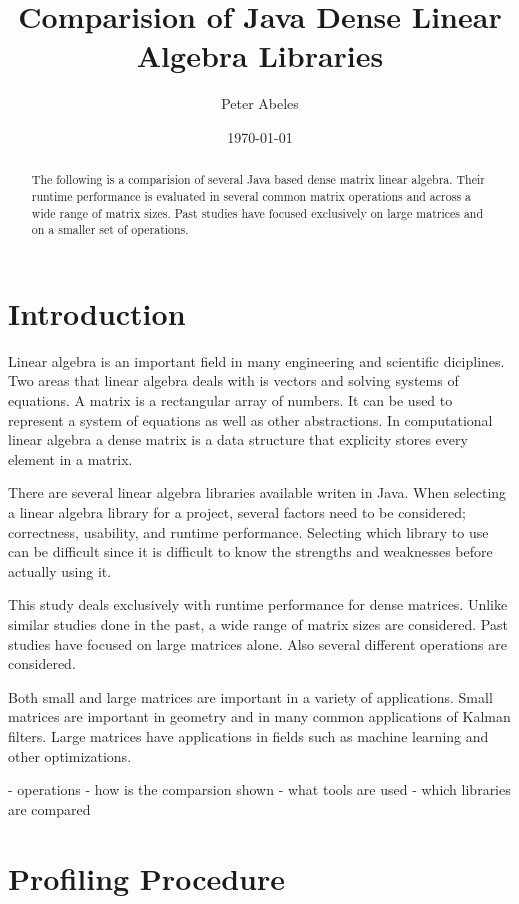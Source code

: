 \documentclass[12pt]{article}%
\title{Comparision of Java Dense Linear Algebra Libraries}
\author{Peter Abeles}
\date{\today}
\begin{document}
\maketitle

\tableofcontents

\begin{abstract}
The following is a comparision of several Java based dense matrix linear algebra.  Their runtime performance is evaluated in several common matrix operations and across a wide range of matrix sizes.  Past studies have focused exclusively on large matrices and on a smaller set of operations.
\end{abstract}


\section{Introduction}

Linear algebra is an important field in many engineering and scientific diciplines.  Two areas that linear algebra deals with is vectors and solving systems of equations.  A matrix is a rectangular array of numbers.  It can be used to represent a system of equations as well as other abstractions.  In computational linear algebra a dense matrix is a data structure that explicity stores every element in a matrix.

There are several linear algebra libraries available writen in Java.  When selecting a linear algebra library for a project, several factors need to be considered; correctness, usability, and runtime performance.  Selecting which library to use can be difficult since it is difficult to know the strengths and weaknesses before actually using it.

This study deals exclusively with runtime performance for dense matrices.  Unlike similar studies done in the past, a wide range of matrix sizes are considered.  Past studies have focused on large matrices alone.  Also several different operations are considered.

Both small and large matrices are important in a variety of applications.  Small matrices are important in geometry and in many common applications of Kalman filters.  Large matrices have applications in fields such as machine learning and other optimizations.

- operations
- how is the comparsion shown
- what tools are used
- which libraries are compared

\section{Profiling Procedure}
\end{document}
